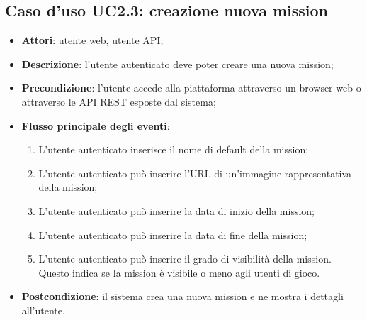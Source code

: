 \subsection{Caso d'uso UC2.3: creazione nuova mission}
\begin{itemize}
\item \textbf{Attori}: utente web, utente API;
\item \textbf{Descrizione}: l'utente autenticato deve poter creare una nuova mission; 
      \item \textbf{Precondizione}: l'utente accede alla piattaforma attraverso un browser web o attraverso le API REST esposte dal sistema;

        \item \textbf{Flusso principale degli eventi}:
          \begin{enumerate}
          \item L'utente autenticato inserisce il nome di default della mission;
          \item L'utente autenticato può inserire l'URL di un'immagine rappresentativa della mission;
          \item L'utente autenticato può inserire la data di inizio della mission;
          \item L'utente autenticato può inserire la data di fine della mission;
          \item L'utente autenticato può inserire il grado di visibilità della mission. Questo indica se la mission è visibile o meno agli utenti di gioco.

      \end{enumerate}
    \item \textbf{Postcondizione}: il sistema crea una nuova mission e ne mostra i dettagli all'utente.
  \end{itemize}
\hypertarget{UC2.4}{}
